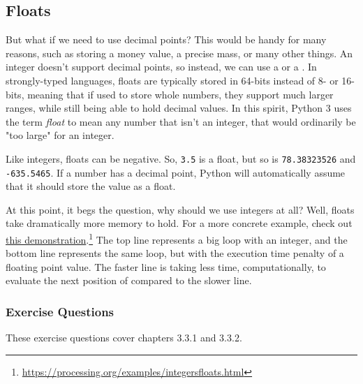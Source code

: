 \subsection{Floats}
But what if we need to use decimal points? This would be handy for many reasons, such as storing a money value, a precise mass, or many other things. An integer doesn't support decimal points, so instead, we can use a  or a . In strongly-typed languages, floats are typically stored in 64-bits instead of 8- or 16-bits, meaning that if used to store whole numbers, they support much larger ranges, while still being able to hold decimal values. In this spirit, Python 3 uses the term \textit{float} to mean any number that isn't an integer, that would ordinarily be "too large" for an integer.\par
Like integers, floats can be negative. So, \verb|3.5| is a float, but so is \verb|78.38323526| and \verb|-635.5465|. If a number has a decimal point, Python will automatically assume that it should store the value as a float.\par
At this point, it begs the question, why should we use integers at all? Well, floats take dramatically more memory to hold. For a more concrete example, check out \href{https://processing.org/examples/integersfloats.html}{this demonstration}.\footnote{\href{https://processing.org/examples/integersfloats.html}{https://processing.org/examples/integersfloats.html}} The top line represents a big loop with an integer, and the bottom line represents the same loop, but with the execution time penalty of a floating point value. The faster line is taking less time, computationally, to evaluate the next position of compared to the slower line.\par
\subsubsection*{Exercise Questions}
These exercise questions cover chapters 3.3.1 and 3.3.2. 
\begin{Exercise}
\end{Exercise}
\begin{Exercise}
\end{Exercise}
